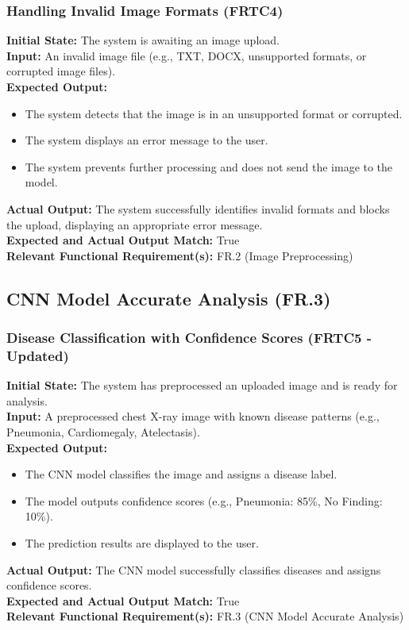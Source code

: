 \documentclass[12pt, titlepage]{article}
\begin{document}
\subsubsection{Handling Invalid Image Formats (FRTC4)}
\textbf{Initial State:} The system is awaiting an image upload.\\
\textbf{Input:} An invalid image file (e.g., TXT, DOCX, unsupported formats, or corrupted image files).\\
\textbf{Expected Output:}
\begin{itemize}
\item The system detects that the image is in an unsupported format or corrupted.
\item The system displays an error message to the user.
\item The system prevents further processing and does not send the image to the model.
\end{itemize}
\textbf{Actual Output:} The system successfully identifies invalid formats and blocks the upload, displaying an appropriate error message.\\
\textbf{Expected and Actual Output Match:} True\\
\textbf{Relevant Functional Requirement(s):} FR.2 (Image Preprocessing)\\

\subsection{CNN Model Accurate Analysis (FR.3)}
\subsubsection{Disease Classification with Confidence Scores (FRTC5 - Updated)}
\textbf{Initial State:} The system has preprocessed an uploaded image and is ready for analysis.\\
\textbf{Input:} A preprocessed chest X-ray image with known disease patterns (e.g., Pneumonia, Cardiomegaly, Atelectasis).\\
\textbf{Expected Output:}
\begin{itemize}
\item The CNN model classifies the image and assigns a disease label.
\item The model outputs confidence scores (e.g., Pneumonia: 85\%, No Finding: 10\%).
\item The prediction results are displayed to the user.
\end{itemize}
\textbf{Actual Output:} The CNN model successfully classifies diseases and assigns confidence scores.\\
\textbf{Expected and Actual Output Match:} True\\
\textbf{Relevant Functional Requirement(s):} FR.3 (CNN Model Accurate Analysis)\\
\end{document}
